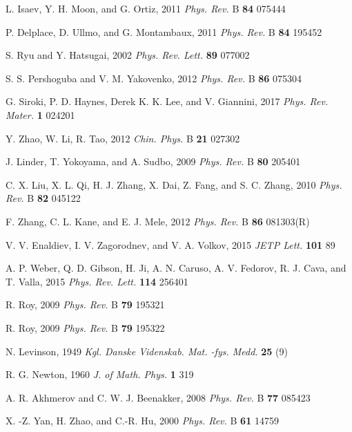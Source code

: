 \documentclass[aps,pra,amsmath,twocolumn,showpacs,bibnotes,10pt]{revtex4-1}
\begin{document}
\begin{thebibliography}{99}
 L. Isaev, Y. H. Moon, and G. Ortiz, 2011 {\it Phys. Rev.} B {\bf 84} 075444 

 P. Delplace, D. Ullmo, and G. Montambaux, 2011 {\it Phys. Rev.} B {\bf 84} 195452 
 
 S. Ryu and Y. Hatsugai, 2002 {\it Phys. Rev. Lett.} {\bf 89} 077002

 S. S. Pershoguba and V. M. Yakovenko, 2012 {\it Phys. Rev.} B {\bf 86} 075304

 G. Siroki, P. D. Haynes, Derek K. K. Lee, and V. Giannini, 2017 {\it Phys. Rev. Mater.} {\bf 1} 024201

 Y. Zhao, W. Li, R. Tao, 2012 {\it Chin. Phys.} B {\bf 21} 027302

 J. Linder, T. Yokoyama, and A. Sudbo, 2009 {\it Phys. Rev.} B {\bf 80} 205401

 C. X. Liu, X. L. Qi, H. J. Zhang, X. Dai, Z. Fang, and S. C. Zhang, 2010 {\it Phys. Rev.} B {\bf 82} 045122

 F. Zhang, C. L. Kane, and E. J. Mele, 2012 {\it Phys. Rev.} B {\bf 86} 081303(R)

 V. V. Enaldiev, I. V. Zagorodnev, and V. A. Volkov, 2015 {\it JETP Lett.} {\bf 101} 89

 A. P. Weber, Q. D. Gibson, H. Ji, A. N. Caruso, A. V. Fedorov, R. J. Cava, and T. Valla, 2015 {\it Phys. Rev. Lett.} {\bf 114} 256401

 R. Roy, 2009 {\it Phys. Rev.} B {\bf 79} 195321

 R. Roy, 2009 {\it Phys. Rev.} B {\bf 79} 195322

 N. Levinson, 1949 {\it Kgl. Danske Videnskab. Mat. -fys. Medd.} {\bf 25} (9)

 R. G. Newton, 1960 {\it J. of Math. Phys.} {\bf 1} 319

 A. R. Akhmerov and C. W. J. Beenakker, 2008 {\it Phys. Rev.} B {\bf 77} 085423

 X. -Z. Yan, H. Zhao, and C.-R. Hu, 2000 {\it Phys. Rev.} B {\bf 61} 14759


\end{thebibliography}
\end{document}
